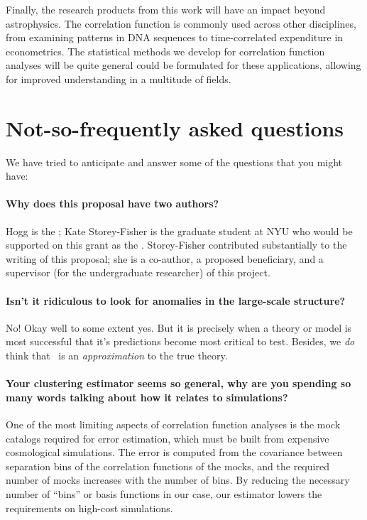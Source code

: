 \documentclass[12pt, fullpage, letterpaper]{article}
\begin{document}
Finally, the research products from this work will have an impact beyond astrophysics.
The correlation function is commonly used across other disciplines, from examining patterns in DNA sequences to time-correlated expenditure in econometrics.
The statistical methods we develop for correlation function analyses will be quite general could be formulated for these applications, allowing for improved understanding in a multitude of fields.

\section{Not-so-frequently asked questions}

We have tried to anticipate and answer some of the
questions that you might have:

\paragraph{Why does this proposal have two authors?}
Hogg is the \PI; Kate Storey-Fisher is the graduate student at NYU who would be supported on this grant as the \GRA.
Storey-Fisher contributed substantially to the writing of this proposal; she is a co-author, a proposed beneficiary, and a supervisor (for the undergraduate researcher) of this project.

\paragraph{Isn't it ridiculous to look for anomalies in the large-scale structure?}
No! Okay well to some extent yes. But it is precisely when a theory or model is most successful that it's predictions become most critical to test. Besides, we \emph{do} think that \LCDM\ is an \emph{approximation} to the true theory.

\paragraph{Your clustering estimator seems so general, why are you spending so many words talking about how it relates to simulations?}
One of the most limiting aspects of correlation function analyses is the mock catalogs required for error estimation, which must be built from expensive cosmological simulations. The error is computed from the covariance between separation bins of the correlation functions of the mocks, and the required number of mocks increases with the number of bins. By reducing the necessary number of ``bins'' or basis functions in our case, our estimator lowers the requirements on high-cost simulations.
\end{document}

